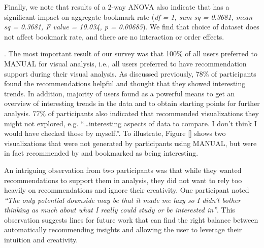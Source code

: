 Finally, we note that results of a 2-way ANOVA also indicate that \SeeDB has a significant impact on 
aggregate bookmark rate ({\em df = 1, sum sq = 0.3681, mean sq = 0.3681, F value = 10.034, p = 0.00685}). 
We find that choice of dataset does not affect bookmark rate, and there are no interaction or order effects.



. 
The most important result of our survey was that 100\% of all users preferred \SeeDB to MANUAL for
visual analysis, i.e., all users preferred to have recommendation support during their visual analysis.
As discussed previously, 78\% of participants found the recommendations helpful and thought that they
showed interesting trends.
In addition, majority of users found \SeeDB as a powerful means to get an overview of interesting trends
in the data and to obtain starting points for further analysis.
77\% of participants also indicated that \SeeDB recommended visualizations they might not explored, e.g.
``\ldots interesting aspects of data to compare. I don't think I would have checked those by myself.''.
To illustrate, Figure \ref{} shows two visualizations that were not generated by participants using MANUAL,
but were in fact recommended by \SeeDB and bookmarked as being interesting.

An intriguing observation from two participants was that while they wanted recommendations to support them
in analysis, they did not want to rely too heavily on recommendations and ignore their creativity.
One participant noted {\em ``The only potential downside may be that it made 
me lazy so I didn't bother thinking as much about what I really could study or be interested in''}.
This observation suggests lines for future work that can find the right balance between automatically 
recommending insights and allowing the user to leverage their intuition and creativity.

